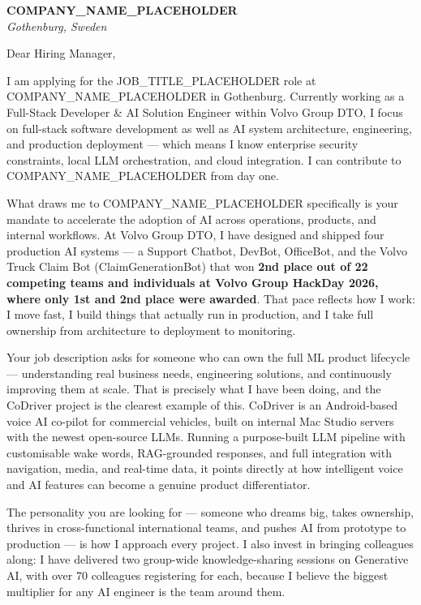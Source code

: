 \documentclass[a4paper,10pt]{article}
\begin{document}
\pagestyle{empty}

{\color{linkedinblue}\Large \textbf{COMPANY_NAME_PLACEHOLDER}}\\
{\color{linkedinblue}\textit{Gothenburg, Sweden}}

\vspace{15pt}

Dear Hiring Manager,

\vspace{8pt}

I am applying for the JOB_TITLE_PLACEHOLDER role at COMPANY_NAME_PLACEHOLDER in Gothenburg. Currently working as a Full-Stack Developer \& AI Solution Engineer within Volvo Group DTO, I focus on full-stack software development as well as AI system architecture, engineering, and production deployment --- which means I know enterprise security constraints, local LLM orchestration, and cloud integration. I can contribute to COMPANY_NAME_PLACEHOLDER from day one.

What draws me to COMPANY_NAME_PLACEHOLDER specifically is your mandate to accelerate the adoption of AI across operations, products, and internal workflows. At Volvo Group DTO, I have designed and shipped four production AI systems --- a Support Chatbot, DevBot, OfficeBot, and the Volvo Truck Claim Bot (ClaimGenerationBot) that won \textbf{2nd place out of 22 competing teams and individuals at Volvo Group HackDay 2026, where only 1st and 2nd place were awarded}. That pace reflects how I work: I move fast, I build things that actually run in production, and I take full ownership from architecture to deployment to monitoring.

Your job description asks for someone who can own the full ML product lifecycle --- understanding real business needs, engineering solutions, and continuously improving them at scale. That is precisely what I have been doing, and the CoDriver project is the clearest example of this. CoDriver is an Android-based voice AI co-pilot for commercial vehicles, built on internal Mac Studio servers with the newest open-source LLMs. Running a purpose-built LLM pipeline with customisable wake words, RAG-grounded responses, and full integration with navigation, media, and real-time data, it points directly at how intelligent voice and AI features can become a genuine product differentiator.

The personality you are looking for --- someone who dreams big, takes ownership, thrives in cross-functional international teams, and pushes AI from prototype to production --- is how I approach every project. I also invest in bringing colleagues along: I have delivered two group-wide knowledge-sharing sessions on Generative AI, with over 70 colleagues registering for each, because I believe the biggest multiplier for any AI engineer is the team around them.
\end{document}
